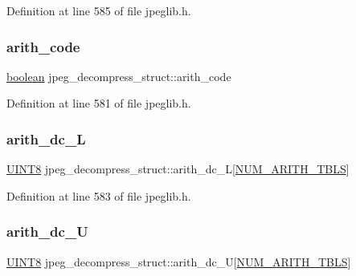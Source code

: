 Definition at line 585 of file jpeglib.\+h.

\mbox{\label{structjpeg__decompress__struct_aa59d02c7dfa58e22321c1f5fa154b151}} 
\subsubsection{\texorpdfstring{arith\_code}{arith\_code}}
{\footnotesize\ttfamily \mbox{\hyperlink{jmorecfg_8h_a7c6368b321bd9acd0149b030bb8275ed}{boolean}} jpeg\+\_\+decompress\+\_\+struct\+::arith\+\_\+code}



Definition at line 581 of file jpeglib.\+h.

\mbox{\label{structjpeg__decompress__struct_a746b5ecfe0401a1ffe423191d4b929b0}} 
\subsubsection{\texorpdfstring{arith\_dc\_L}{arith\_dc\_L}}
{\footnotesize\ttfamily \mbox{\hyperlink{jmorecfg_8h_adfb9a8ea1dd59f151065f763e1e9acd6}{U\+I\+N\+T8}} jpeg\+\_\+decompress\+\_\+struct\+::arith\+\_\+dc\+\_\+L\mbox{[}\mbox{\hyperlink{jpeglib_8h_a4efb0fccc8d9db72ca18f32a26fad6ab}{N\+U\+M\+\_\+\+A\+R\+I\+T\+H\+\_\+\+T\+B\+LS}}\mbox{]}}



Definition at line 583 of file jpeglib.\+h.

\mbox{\label{structjpeg__decompress__struct_af181cece11c6bb960cb97f648f0e67aa}} 
\subsubsection{\texorpdfstring{arith\_dc\_U}{arith\_dc\_U}}
{\footnotesize\ttfamily \mbox{\hyperlink{jmorecfg_8h_adfb9a8ea1dd59f151065f763e1e9acd6}{U\+I\+N\+T8}} jpeg\+\_\+decompress\+\_\+struct\+::arith\+\_\+dc\+\_\+U\mbox{[}\mbox{\hyperlink{jpeglib_8h_a4efb0fccc8d9db72ca18f32a26fad6ab}{N\+U\+M\+\_\+\+A\+R\+I\+T\+H\+\_\+\+T\+B\+LS}}\mbox{]}}



